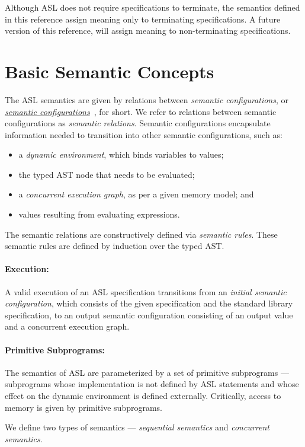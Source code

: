 Although ASL does not require specifications to terminate, the semantics defined in this
reference assign meaning only to terminating specifications.
A future version of this reference, will assign meaning to non-terminating specifications.

\section{Basic Semantic Concepts}
The ASL semantics are given by relations between \emph{semantic configurations},
or \hyperlink{def-configuration}{\emph{semantic configurations}}~\cite{SemanticsWithApplicationsBook}, for short.
We refer to relations between semantic configurations as \emph{semantic relations}.
Semantic configurations encapsulate information needed to transition into other semantic configurations, such as:
\begin{itemize}
  \item a \emph{dynamic environment}, which binds variables to values;
  \item the typed AST node that needs to be evaluated;
  \item a \emph{concurrent execution graph}, as per a given memory model; and
  \item values resulting from evaluating expressions.
\end{itemize}
The semantic relations are constructively defined via \emph{semantic rules}.
These semantic rules are defined by induction over the typed AST.

\paragraph{Execution:}
A valid execution of an ASL specification transitions from an \emph{initial semantic configuration},
which consists of the given specification and the standard library specification, to an output semantic configuration
consisting of an output value and a concurrent execution graph.

\paragraph{Primitive Subprograms:}
The semantics of ASL are parameterized by a set of primitive subprograms ---
subprograms whose implementation is not defined by ASL statements and whose effect on the dynamic environment
is defined externally. Critically, access to memory is given by primitive subprograms.

We define two types of semantics --- \emph{sequential semantics} and \emph{concurrent semantics}.

